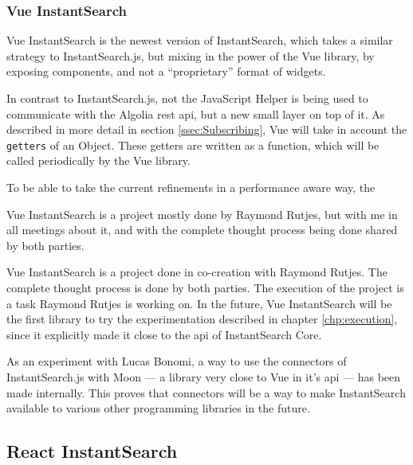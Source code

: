 
\subsubsection{Vue InstantSearch} %
\label{ssub:vue_instantsearch}

Vue InstantSearch is the newest version of InstantSearch, which takes a similar strategy to InstantSearch.js, but mixing in the power of the Vue \gls{library}, by exposing components, and not a ``proprietary'' format of widgets.

In contrast to InstantSearch.js, not the JavaScript Helper is being used to communicate with the Algolia \acrshort{rest} \acrshort{api}, but a new small layer on top of it. As described in more detail in section \ref{ssec:Subscribing}, Vue will take in account the {\tt getters} of an Object. These getters are written as a function, which will be called periodically by the Vue \gls{library}. 

To be able to take the current refinements in a performance aware way, the 

Vue InstantSearch is a project mostly done by Raymond Rutjes, but with me in all meetings about it, and with the complete thought process being done shared by both parties.

Vue InstantSearch is a project done in co-creation with Raymond Rutjes. The complete thought process is done by both parties. The execution of the project is a task Raymond Rutjes is working on. In the future, Vue InstantSearch will be the first \gls{library} to try the experimentation described in chapter \ref{chp:execution}, since it explicitly made it close to the \acrshort{api} of InstantSearch Core.

As an experiment with Lucas Bonomi, a way to use the connectors of InstantSearch.js with Moon --- a \gls{library} very close to Vue in it's \acrshort{api} --- has been made internally. This proves that connectors will be a way to make InstantSearch available to various other programming libraries in the future.




\subsection{React InstantSearch} %
\label{sub:react_instantearch}

